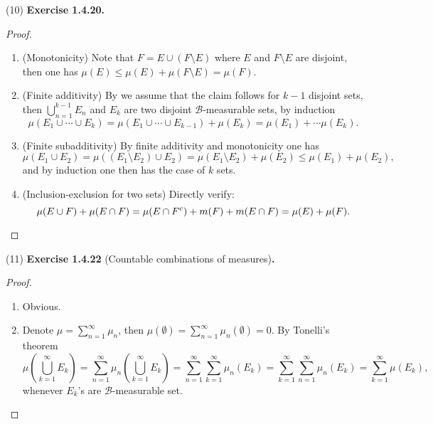 \documentclass[a4paper]{article}
\begin{document}
(10) {\bfseries Exercise 1.4.20.}\begin{proof}\ 
\begin{enumerate}[label = (\roman*)]
    \item (Monotonicity) Note that $F = E \cup (F \setminus E)$ where $E$ and $F \setminus E$ are disjoint, then
    one has $\mu(E) \leq \mu(E) + \mu(F \setminus E) = \mu(F)$.
    \item (Finite additivity) By we assume that the claim follows for $k - 1$ disjoint sets, then $\bigcup_{n = 1}^{k - 1}E_n$
    and $E_k$ are two disjoint $\mathcal{B}$-measurable sets, by induction$$
    \mu(E_1 \cup \cdots \cup E_k) = \mu(E_1 \cup \cdots \cup E_{k - 1}) + \mu(E_k) = \mu(E_1) + \cdots \mu(E_k).
    $$
    \item (Finite subadditivity) By finite additivity and monotonicity one has $$
    \mu(E_1 \cup E_2) = \mu((E_1 \setminus E_2) \cup E_2) = \mu(E_1 \setminus E_2) + \mu(E_2) \leq \mu(E_1) + \mu(E_2),
    $$ and by induction one then has the case of $k$ sets.
    \item (Inclusion-exclusion for two sets) Directly verify:\[
    \mu(E \cup F) + \mu(E \cap F) = \mu(E \cap F^c) + m(F) + m(E \cap F) = \mu(E) + \mu(F).\qedhere
    \]
\end{enumerate}
\end{proof}

(11) {\bfseries Exercise 1.4.22} (Countable combinations of measures){\bfseries .}\begin{proof}\ 
\begin{enumerate}[label = (\roman*)]
    \item Obvious.
    \item Denote $\mu = \sum_{n = 1}^\infty \mu_n$, then $\mu(\emptyset) = \sum_{n = 1}^\infty \mu_n(\emptyset) = 0$. 
    By Tonelli's theorem $$
    \mu(\bigcup_{k = 1}^\infty E_k) = \sum_{n = 1}^\infty \mu_n(\bigcup_{k = 1}^\infty E_k) = \sum_{n = 1}^\infty
    \sum_{k = 1}^\infty \mu_n(E_k) = \sum_{k = 1}^\infty \sum_{n = 1}^\infty \mu_n(E_k) = \sum_{k = 1}^\infty \mu(E_k),
    $$whenever $E_k$'s are $\mathcal{B}$-measurable set.\qedhere
\end{enumerate}
\end{proof}
\end{document}
